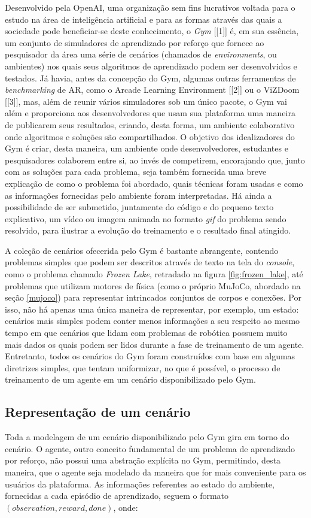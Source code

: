 \documentclass[cic,tc]{iiufrgs}
\begin{document}
Desenvolvido pela OpenAI, uma organização sem fins lucrativos voltada para o
estudo na área de inteligência artificial e para as formas através das quais a
sociedade pode beneficiar-se deste conhecimento, o \textit{Gym} [[1]] é, em sua
essência, um conjunto de simuladores de aprendizado por reforço que fornece ao
pesquisador da área uma série de cenários (chamados de \textit{environments}, ou
ambientes) nos quais seus algoritmos de aprendizado podem ser desenvolvidos e
testados. Já havia, antes da concepção do Gym, algumas outras ferramentas de
\textit{benchmarking} de AR, como o Arcade Learning Environment [[2]] ou o
ViZDoom [[3]], mas, além de reunir vários simuladores sob um único pacote, o Gym
vai além e proporciona aos desenvolvedores que usam sua plataforma uma maneira
de publicarem seus resultados, criando, desta forma, um ambiente
colaborativo onde algoritmos e soluções são compartilhados. O objetivo dos
idealizadores do Gym é criar, desta maneira, um ambiente onde desenvolvedores,
estudantes e pesquisadores colaborem entre si, ao invés de competirem,
encorajando que, junto com as soluções para cada problema, seja também fornecida
uma breve explicação de como o problema foi abordado, quais técnicas foram
usadas e como as informações fornecidas pelo ambiente foram interpretadas. Há
ainda a possibilidade de ser submetido, juntamente do código e do pequeno texto
explicativo, um vídeo ou imagem animada no formato \textit{gif} do problema
sendo resolvido, para ilustrar a evolução do treinamento e o resultado final
atingido.


A coleção de cenários ofecerida pelo Gym é bastante abrangente, contendo
problemas simples que podem ser descritos através de texto na tela do
\textit{console}, como  o problema chamado \textit{Frozen Lake}, retradado na
figura \ref{fig:frozen_lake}, até problemas que utilizam motores de física (como
o próprio MuJoCo, abordado na seção \ref{mujoco}) para representar intrincados
conjuntos de corpos e conexões. Por isso, não há apenas uma única maneira de
representar, por exemplo, um estado: cenários mais simples podem conter menos
informações a seu respeito ao mesmo tempo em que cenários que lidam com
problemas de robótica possuem muito mais dados os quais podem ser lidos durante
a fase de treinamento de um agente. Entretanto, todos os cenários do Gym foram
construídos com base em algumas diretrizes simples, que tentam uniformizar, no
que é possível, o processo de treinamento de um agente em um cenário
disponibilizado pelo Gym.


\subsection{Representação de um cenário}
Toda a modelagem de um cenário disponibilizado pelo Gym gira em torno do
cenário. O agente, outro conceito fundamental de um problema de aprendizado por
reforço, não possui uma abstração explícita no Gym, permitindo, desta maneira,
que o agente seja modelado da maneira que for mais conveniente para os usuários
da plataforma. As informações referentes ao estado do ambiente, fornecidas a
cada episódio de aprendizado, seguem o formato $(observation, reward, done)$,
onde:
\end{document}
